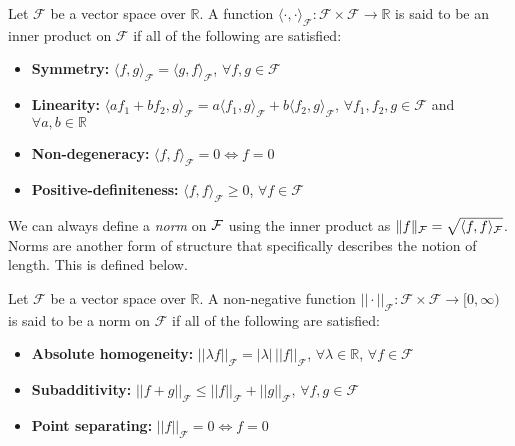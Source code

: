 \documentclass[a4paper,showframe,11pt,draft]{report}
\begin{document}
\begin{definition}
	Let $\mathcal F$ be a vector space over $\mathbb R$. A function $\langle\cdot,\cdot\rangle_{\mathcal F}:\mathcal F \times \mathcal F \rightarrow \mathbb R$ is said to be an inner product on $\mathcal F$ if all of the following are satisfied:
	\begin{itemize}
	\vspace{-1mm}
	\item \textbf{Symmetry:} $\langle f, g\rangle_{\mathcal F} = \langle g, f	\rangle_{\mathcal F}$, $\forall f,g \in \mathcal F$
	\vspace{-1mm}
	\item \textbf{Linearity:} $\langle a f_1 + b f_2, g\rangle_{\mathcal F} = a\langle f_1,g \rangle_{\mathcal F} + b\langle f_2,g \rangle_{\mathcal F}$, $\forall f_1, f_2, g \in \mathcal F$ and $\forall a,b \in \mathbb R$
	\vspace{-1mm}
	\item \textbf{Non-degeneracy:} $\langle f, f\rangle_{\mathcal F} = 0 \Leftrightarrow f=0$
	\vspace{-1mm}
	\item \textbf{Positive-definiteness:} $\langle f, f\rangle_{\mathcal F} \geq 0$, $\forall f \in \mathcal F$
	\end{itemize}
	\vspace{-1mm}	
\end{definition}

We can always define a \emph{norm} on ${\mathcal F}$ using the inner product as $\lVert f\rVert_{\mathcal F} = \sqrt{\langle f,f\rangle_{\mathcal F}}$.
Norms are another form of structure that specifically describes the notion of length. 
This is defined below.

\begin{definition}[Norms]
	Let $\mathcal F$ be a vector space over $\mathbb R$. A non-negative function $||\cdot||_{\mathcal F}:\mathcal F \times \mathcal F \rightarrow \mathbb [0,\infty)$ is said to be a norm  on $\mathcal F$ if all of the following are satisfied:
	\begin{itemize}
	\item \textbf{Absolute homogeneity:} $||\lambda f||_{\mathcal F} = |\lambda| \, ||f||_{\mathcal F}$, $\forall \lambda \in \mathbb R$, $\forall f \in \mathcal F$
	\item \textbf{Subadditivity:} $||f+g||_{\mathcal F} \leq ||f||_{\mathcal F} + ||g||_{\mathcal F}$, $\forall f,g \in \mathcal F$
	\item \textbf{Point separating:} $||f||_{\mathcal F} = 0 \Leftrightarrow f=0$
	\end{itemize}
\end{definition}
\end{document}
